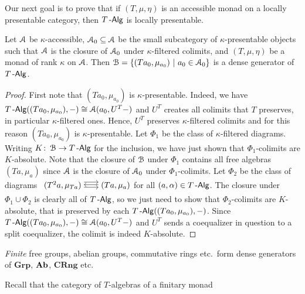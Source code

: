\documentclass[a4paper,11pt,oneside,openany]{scrbook}
\begin{document}
Our next goal is to prove that if $(T,\mu,\eta)$ is an accessible monad on a locally presentable category, then $T\operatorname{-\mathsf{Alg}}$ is locally presentable.
\begin{prop}
	Let $\operatorname{\mathcal{A}}$ be $\kappa$-accessible, $\operatorname{\mathcal{A}}_0\subseteq\operatorname{\mathcal{A}}$ be the small subcategory of $\kappa$-presentable objects such that $\operatorname{\mathcal{A}}$ is the closure of $\operatorname{\mathcal{A}}_0$ under $\kappa$-filtered colimits, and $(T,\mu,\eta)$ be a monad of rank $\kappa$ on $\operatorname{\mathcal{A}}$. Then $\operatorname{\mathcal{B}}=\{ (Ta_0,\mu_{a_0})\ | \ a_0\in\operatorname{\mathcal{A}}_0 \}$ is a dense generator of $T\operatorname{-\mathsf{Alg}}$.
\end{prop}
\begin{proof}
	First note that $(Ta_0,\mu_{a_0})$ is $\kappa$-presentable. Indeed, we have
    $T\operatorname{-\mathsf{Alg}}((Ta_0,\mu_{a_0}),-)\cong\operatorname{\mathcal{A}}(a_0,U^T-)$ and $U^T$ creates all colimits
    that $T$ preserves, in particular $\kappa$-filtered ones. Hence, $U^T$
    preserves $\kappa$-filtered colimits and for this reason $(Ta_0,\mu_{a_0})$
    is $\kappa$-presentable. Let $\Phi_1$  be the class of $\kappa$-filtered
    diagrams. Writing $K\colon\operatorname{\mathcal{B}}\to T\operatorname{-\mathsf{Alg}}$ for the inclusion, we have just shown
    that $\Phi_1$-colimits are $K$-absolute. Note that the closure of $\operatorname{\mathcal{B}}$ under
    $\Phi_1$ contains all free algebras $(Ta,\mu_a)$ since $\operatorname{\mathcal{A}}$ is the closure
    of $\operatorname{\mathcal{A}}_0$ under $\Phi_1$-colimits. Let $\Phi_2$ be the class of diagrams
    $\begin{tikzcd}
	        (T^2a,\mu_{Ta})\hspace{-1.5mm}\arrow[r, shift right=.5ex, shorten <= .3em, shorten >= .3em]  \arrow[r, shift left=1ex, shorten <= .3em, shorten >= .3em] & \hspace{-1.5mm}(Ta,\mu_a)\arrow[l, shift right=.25ex, shorten <=.3em, shorten >=.3em]
		\end{tikzcd}\hspace{-1.5mm}$ for all $(a,\alpha)\in T\operatorname{-\mathsf{Alg}}$. The closure
        under $\Phi_1\cup\Phi_2$ is clearly all of $T\operatorname{-\mathsf{Alg}}$, so we just need to
        show that $\Phi_2$-colimits are $K$-absolute, that is preserved by each
        $T\operatorname{-\mathsf{Alg}}((Ta_0,\mu_{a_0}),-)$. Since
        $T\operatorname{-\mathsf{Alg}}((Ta_0,\mu_{a_0}),-)\cong\operatorname{\mathcal{A}}(a_0, U^T-)$ and $U^T$ sends a
        coequalizer in question to a split coequalizer, the colimit is indeed
        $K$-absolute.
\end{proof}
\begin{exmp}
	\emph{Finite} free groups, abelian groups, commutative rings etc.\ form
    dense generators of $\mathbf{Grp}$, ${\normalfont\textbf{Ab}}$, $\mathbf{CRng}$ etc.
\end{exmp}
Recall that the category of $T$-algebras of a finitary monad
\end{document}
